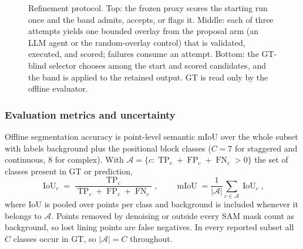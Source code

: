 \documentclass[a4paper,fleqn]{cas-dc}
\begin{document}
\begin{figure}[t]
{}
\caption{Refinement protocol. Top: the frozen proxy scores the starting run once and the band admits, accepts, or flags it. Middle: each of three attempts yields one bounded overlay from the proposal arm (an LLM agent or the random-overlay control) that is validated, executed, and scored; failures consume an attempt. Bottom: the GT-blind selector chooses among the start and scored candidates, and the band is applied to the retained output. GT is read only by the offline evaluator.}
\label{fig:verification}
\end{figure}

\subsubsection{Evaluation metrics and uncertainty}
\label{sec:metrics}

Offline segmentation accuracy is point-level semantic mIoU over the whole subset with labels background plus the positional block classes ($C=7$ for staggered and continuous, $8$ for complex). With $\mathcal A=\{c:\operatorname{TP}_c+\operatorname{FP}_c+\operatorname{FN}_c>0\}$ the set of classes present in GT or prediction,
\begin{equation}
\operatorname{IoU}_c
=
\frac{\operatorname{TP}_c}
{\operatorname{TP}_c+\operatorname{FP}_c+\operatorname{FN}_c},
\qquad
\operatorname{mIoU}
=
\frac{1}{|\mathcal A|}\sum_{c\in\mathcal A}\operatorname{IoU}_c ,
\end{equation}
where IoU is pooled over points per class and background is included whenever it belongs to $\mathcal A$. Points removed by denoising or outside every SAM mask count as background, so lost lining points are false negatives. In every reported subset all $C$ classes occur in GT, so $|\mathcal A|=C$ throughout.
\end{document}
